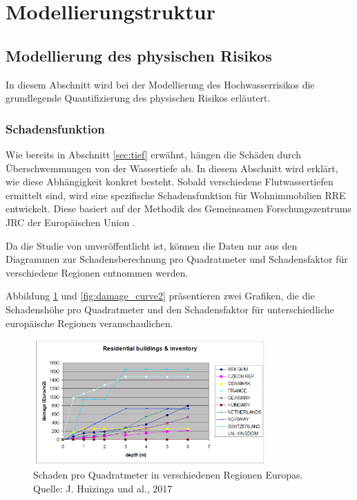 
\section{Modellierungstruktur}
\subsection{Modellierung des physischen Risikos}
In diesem Abschnitt wird bei der Modellierung des Hochwasserrisikos die grundlegende Quantifizierung des physischen Risikos erläutert.

\subsubsection{Schadensfunktion}
Wie bereits in Abschnitt \ref{sec:tief} erwähnt, hängen die Schäden durch Überschwemmungen von der Wassertiefe ab. In diesem Abschnitt wird erklärt, wie diese Abhängigkeit konkret besteht.
Sobald verschiedene Flutwassertiefen ermittelt sind, wird eine spezifische Schadensfunktion für Wohnimmobilien \acs{RRE} entwickelt. Diese basiert auf der Methodik des Gemeinsamen Forschungszentrums \acs{JRC} der Europäischen Union \parencite{huizinga2017global}.

Da die Studie von \textcite{huizinga2007flood} unveröffentlicht ist, können die Daten nur aus den Diagrammen zur Schadensberechnung pro Quadratmeter und Schadensfaktor für verschiedene Regionen entnommen werden.

Abbildung \ref{fig:damage_curve1} und \ref{fig:damage_curve2} präsentieren zwei Grafiken, die die Schadenshöhe pro Quadratmeter und den Schadensfaktor für unterschiedliche europäische Regionen veranschaulichen.

\begin{figure}[H]
    \centering
    \includegraphics[width=0.8\textwidth]{figures/RREdamagem2.png}
    \caption{Schaden pro Quadratmeter in verschiedenen Regionen Europas. Quelle: J. Huizinga und al., 2017}
    \label{fig:damage_curve1}
\end{figure}

